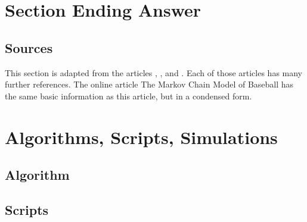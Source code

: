 \documentclass[12pt]{article}
\begin{document}
\section*{Section Ending Answer}

\subsection*{Sources} This section is adapted from the articles
\cite{cover77},
\cite{dangelo10}, \cite{osbourne20} and
\cite{pankin}.  Each of those articles has many further references.  The
online article 
{The Markov Chain Model of Baseball} has the same basic information as
this article, but in a condensed form.

\nocite{}
\nocite{}

\hr

\section*{Algorithms, Scripts, Simulations}

\subsection*{Algorithm}

\subsection*{Scripts}
\end{document}
